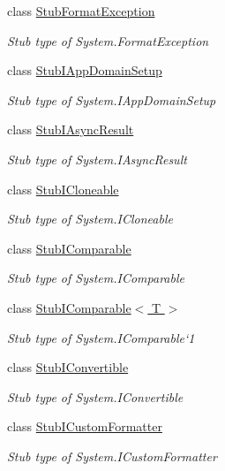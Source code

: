 \begin{DoxyCompactItemize}
class \hyperlink{class_system_1_1_fakes_1_1_stub_format_exception}{Stub\-Format\-Exception}
\begin{DoxyCompactList}\small\item\em Stub type of System.\-Format\-Exception\end{DoxyCompactList}\item 
class \hyperlink{class_system_1_1_fakes_1_1_stub_i_app_domain_setup}{Stub\-I\-App\-Domain\-Setup}
\begin{DoxyCompactList}\small\item\em Stub type of System.\-I\-App\-Domain\-Setup\end{DoxyCompactList}\item 
class \hyperlink{class_system_1_1_fakes_1_1_stub_i_async_result}{Stub\-I\-Async\-Result}
\begin{DoxyCompactList}\small\item\em Stub type of System.\-I\-Async\-Result\end{DoxyCompactList}\item 
class \hyperlink{class_system_1_1_fakes_1_1_stub_i_cloneable}{Stub\-I\-Cloneable}
\begin{DoxyCompactList}\small\item\em Stub type of System.\-I\-Cloneable\end{DoxyCompactList}\item 
class \hyperlink{class_system_1_1_fakes_1_1_stub_i_comparable}{Stub\-I\-Comparable}
\begin{DoxyCompactList}\small\item\em Stub type of System.\-I\-Comparable\end{DoxyCompactList}\item 
class \hyperlink{class_system_1_1_fakes_1_1_stub_i_comparable_3_01_t_01_4}{Stub\-I\-Comparable$<$ T $>$}
\begin{DoxyCompactList}\small\item\em Stub type of System.\-I\-Comparable`1\end{DoxyCompactList}\item 
class \hyperlink{class_system_1_1_fakes_1_1_stub_i_convertible}{Stub\-I\-Convertible}
\begin{DoxyCompactList}\small\item\em Stub type of System.\-I\-Convertible\end{DoxyCompactList}\item 
class \hyperlink{class_system_1_1_fakes_1_1_stub_i_custom_formatter}{Stub\-I\-Custom\-Formatter}
\begin{DoxyCompactList}\small\item\em Stub type of System.\-I\-Custom\-Formatter\end{DoxyCompactList}\item 

\end{DoxyCompactItemize}
